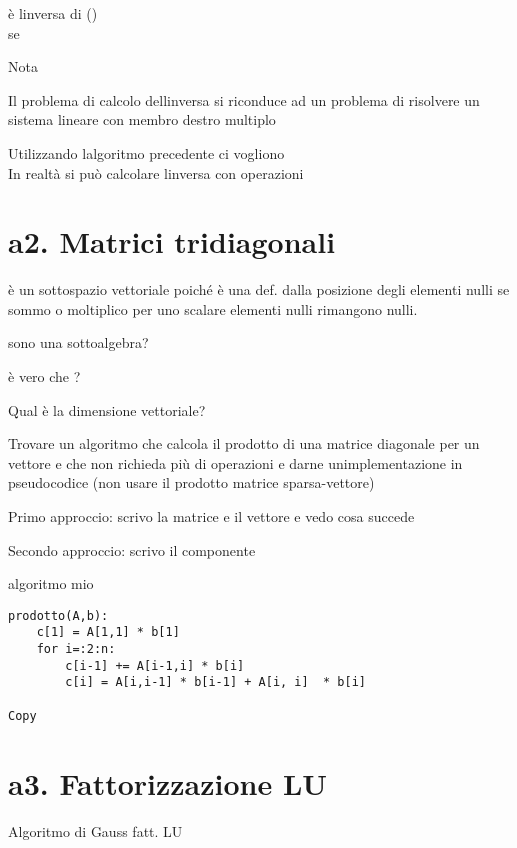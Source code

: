\documentclass[
]{article}
\begin{document}
{} è l\textquotesingle inversa di {} ({})\\
se {}\\
{}{}{}

Nota

Il problema di calcolo dell\textquotesingle inversa si riconduce ad un
problema di risolvere un sistema lineare con membro destro multiplo

Utilizzando l\textquotesingle algoritmo precedente ci vogliono\\
{}In realtà si può calcolare l\textquotesingle inversa con {} operazioni

\hypertarget{a2.-matrici-tridiagonali}{%
\section{a2. Matrici tridiagonali}\label{a2.-matrici-tridiagonali}}

{} è un sottospazio vettoriale poiché è una def. dalla posizione degli
elementi nulli se sommo o moltiplico per uno scalare elementi nulli
rimangono nulli.

sono una sottoalgebra?

è vero che {}?

Qual è la dimensione vettoriale?

{}

Trovare un algoritmo che calcola il prodotto di una matrice diagonale {}
per un vettore {} e che non richieda più di {} operazioni e darne
un\textquotesingle implementazione in pseudocodice (non usare il
prodotto matrice sparsa-vettore)

Primo approccio: scrivo la matrice e il vettore e vedo cosa succede

Secondo approccio: scrivo il componente {}

algoritmo mio

\begin{verbatim}
prodotto(A,b):
    c[1] = A[1,1] * b[1]
    for i=:2:n:
        c[i-1] += A[i-1,i] * b[i]
        c[i] = A[i,i-1] * b[i-1] + A[i, i]  * b[i]
        
Copy
\end{verbatim}

\hypertarget{a3.-fattorizzazione-lu}{%
\section{a3. Fattorizzazione LU}\label{a3.-fattorizzazione-lu}}

Algoritmo di Gauss {} fatt. LU
\end{document}
